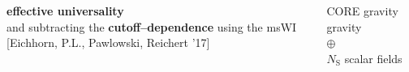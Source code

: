 \documentclass[]{beamer}  %
\newcommand\NS{ N_{\scriptscriptstyle{\mathrm{S}}} }
\begin{document}
\begin{frame}
\begin{columns}[T]
\begin{column}{.8\textwidth}
\begin{enumerate}[1]
{\begin{minipage}{.8\linewidth}
      \item
        \textbf{effective universality}\\
        and subtracting the \textbf{cutoff--dependence} using the msWI\\[3pt]
        [Eichhorn, P.L., Pawlowski, Reichert '17]
      \end{minipage}%
    }\usebox{\bracebox}%


    \end{enumerate}
  \end{column}

  \hspace{-2.5cm}
  \begin{column}{.2\textwidth}
    \begin{center}
      \vspace{11pt}
      CORE gravity\\
      \vspace{105pt}
      gravity\\[2pt]
      $\oplus$\\[3pt]
      $\NS$ scalar fields
    \end{center}
  \end{column}
\end{columns}
\end{frame}


\end{document}
